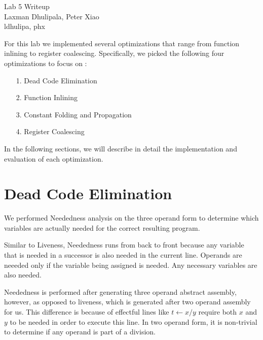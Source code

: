 \documentclass[11pt]{article}
\newcommand{\myname}{Laxman Dhulipala, Peter Xiao}
\newcommand{\myandrew}{ldhulipa, phx}
\begin{document}
\medskip                        %

\thispagestyle{plain}
\begin{center}                  %
{\Large Lab 5 Writeup} \\
 \vspace{2 mm}
\myname \\
\myandrew
\end{center}

For this lab we implemented several optimizations that range from function inlining
to register coalescing. Specifically, we picked the following four optimizations to focus
on :

\begin{itemize}
  \item[1.] Dead Code Elimination
  \item[2.] Function Inlining
  \item[3.] Constant Folding and Propagation
  \item[4.] Register Coalescing
\end{itemize}

In the following sections, we will describe in detail the implementation and evaluation of
each optimization.

\section{Dead Code Elimination}

We performed Neededness analysis on the three operand form to determine which
variables are actually needed for the correct resulting program.

Similar to Liveness, Neededness runs from back to front because any variable
that is needed in a successor is also needed in the current line. Operands are
neeeded only if the variable being assigned is needed. Any necessary variables
are also needed.

Neededness is performed after generating three operand abstract assembly, however, as
opposed to liveness, which is generated after two operand assembly for us. This
difference is because of effectful lines like $t \leftarrow x \slash y$ require
both $x$ and $y$ to be needed in order to execute this line. In two operand
form, it is non-trivial to determine if any operand is part of a division.
\end{document}
